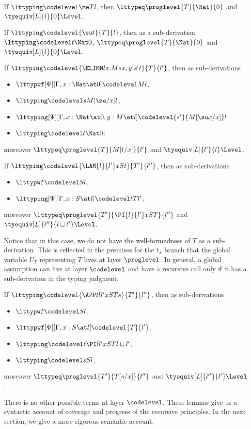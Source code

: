 \begin{lemma}
  If $\lttyping \codelevel \ze T l$, then $\lttypeq \proglevel{T}{\Nat}{0}$
  and $\tyequiv[L]{l}{0}\Level$.   
\end{lemma}
\begin{lemma}
  If $\lttyping \codelevel{\su t}{T}{l}$, then as a sub-derivation $\lttyping \codelevel t{\Nat}{0}$,
  $\lttypeq \proglevel{T}{\Nat}{0}$ and
  $\tyequiv[L]{l}{0}\Level$.
\end{lemma}
\begin{lemma}
  If $\lttyping \codelevel{\ELIMN l{x.M}{s}{x,y.s'}t}{T}{l'}$, then as sub-derivations
  \begin{itemize}
  \item $\lttypwf[\Psi][\Gamma, x : \Nat \at 0] \codelevel M l$,
  \item $\lttyping \codelevel s {M[\ze/x]}l$,
  \item $\lttyping[\Psi][\Gamma, x : \Nat \at 0, y : M \at l] \codelevel {s'}{M[\su x/x]}l$
  \item $\lttyping \codelevel t \Nat 0$;
  \end{itemize}
  moreover $\lttypeq \proglevel{T}{M[t/x]}{l'}$ and
  $\tyequiv[L]{l'}{l}\Level$.
\end{lemma}
\begin{lemma}
  If $\lttyping \codelevel{\LAM{l}{l'}x S t}{T'}{l''}$, then as sub-derivations
  \begin{itemize}
  \item $\lttypwf \codelevel S l$,
  \item $\lttyping[\Psi][\Gamma, x : S \at l] \codelevel t{T}{l'}$;
  \end{itemize}
  moreover $\lttypeq \proglevel{T'}{\PI{l}{l'}x S T}{l''}$ and
  $\tyequiv[L]{l''}{l \sqcup l'}\Level$.
\end{lemma}
Notice that in this case, we do not have the well-formedness of $T$ as a
sub-derivation. %
This is reflected in the premises for the $t_\lambda$ branch that the global variable $U_T$
representing $T$ lives at layer $\proglevel$. %
In general, a global assumption can live at layer $\codelevel$ and have a recursive call only
if it has a sub-derivation in the typing judgment.
\begin{lemma}
  If $\lttyping \codelevel{\APP t {l}{l'}x S T s}{T'}{l''}$, then as sub-derivations
  \begin{itemize}
  \item $\lttypwf \codelevel S l$,
  \item $\lttypwf[\Psi][\Gamma, x : S \at l] \codelevel{T}{l'}$,
  \item $\lttyping \codelevel t{\PI l{l'} x S T}{l \sqcup l'}$,
  \item $\lttyping \codelevel s S l$;
  \end{itemize}
  moreover $\lttypeq \proglevel{T'}{T[s/x]}{l''}$ and
  $\tyequiv[L]{l''}{l'}\Level$.
\end{lemma}
There is no other possible terms at layer $\codelevel$. %
These lemmas give us a syntactic account of coverage and progress of the recursive
principles. %
In the next section, we give a more rigorous semantic account.
